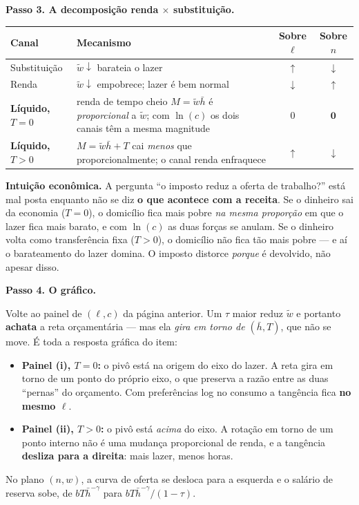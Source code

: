 \documentclass[11pt, a4paper]{article}
\newcommand{\passo}[1]{\medskip\noindent\textbf{#1}\par\nobreak}
\newcommand{\intuicao}[1]{%
  \medskip\noindent\textcolor{midblue}{\textbf{Intuição econômica.}} #1\par}
\newcommand{\wt}{\widetilde{w}}
\begin{document}
\passo{Passo 3. A decomposição renda $\times$ substituição.}
\begin{center}
\small
\renewcommand{\arraystretch}{1.3}
\begin{tabular}{@{}lp{5.0cm}cc@{}}
\toprule
\textbf{Canal} & \textbf{Mecanismo} & \textbf{Sobre $\ell$} & \textbf{Sobre $n$} \\
\midrule
Substituição & $\wt\downarrow$ barateia o lazer & $\uparrow$ & $\downarrow$ \\
Renda & $\wt\downarrow$ empobrece; lazer é bem normal & $\downarrow$ & $\uparrow$ \\
\midrule
\textbf{Líquido, $T=0$} & renda de tempo cheio $M=\wt\bar h$ é \emph{proporcional} a
  $\wt$; com $\ln(c)$ os dois canais têm a mesma magnitude & $0$ & $\bm{0}$ \\
\textbf{Líquido, $T>0$} & $M=\wt\bar h + T$ cai \emph{menos} que proporcionalmente;
  o canal renda enfraquece & $\uparrow$ & $\bm{\downarrow}$ \\
\bottomrule
\end{tabular}
\end{center}

\intuicao{A pergunta ``o imposto reduz a oferta de trabalho?'' está mal posta enquanto não
se diz \textbf{o que acontece com a receita}. Se o dinheiro sai da economia ($T=0$), o
domicílio fica mais pobre \emph{na mesma proporção} em que o lazer fica mais barato, e com
$\ln(c)$ as duas forças se anulam. Se o dinheiro volta como transferência fixa ($T>0$), o
domicílio não fica tão mais pobre --- e aí o barateamento do lazer domina. O imposto
distorce \emph{porque} é devolvido, não apesar disso.}

\passo{Passo 4. O gráfico.}
Volte ao painel de $(\ell,c)$ da página anterior. Um $\tau$ maior reduz $\wt$ e portanto
\textbf{achata} a reta orçamentária --- mas ela \emph{gira em torno de $(\bar h,T)$}, que
não se move. É toda a resposta gráfica do item:
\begin{itemize}
\item \textbf{Painel (i), $T=0$:} o pivô está na origem do eixo do lazer. A reta gira em
torno de um ponto do próprio eixo, o que preserva a razão entre as duas ``pernas'' do
orçamento. Com preferências log no consumo a tangência fica \textbf{no mesmo $\ell$}.
\item \textbf{Painel (ii), $T>0$:} o pivô está \emph{acima} do eixo. A rotação em torno de
um ponto interno não é uma mudança proporcional de renda, e a tangência \textbf{desliza
para a direita}: mais lazer, menos horas.
\end{itemize}
No plano $(n,w)$, a curva de oferta se desloca para a esquerda e o salário de reserva sobe,
de $b T\bar h^{-\gamma}$ para $b T\bar h^{-\gamma}/(1-\tau)$.
\end{document}
